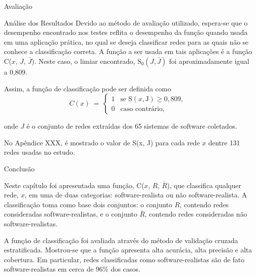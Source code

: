 \begin{section}{Avaliação}
\begin{subsection}{Análise dos Resultados}
	Devido ao método de avaliação utilizado, espera-se que o desempenho encontrado nos testes reflita o desempenho da função quando usada em uma aplicação prática, no qual se deseja classificar redes para as quais não se conhece a classificação correta. A função a ser usada em tais aplicações é a função C($x$, $J$, $\bar{J}$). Neste caso, o limiar encontrado, $\mathrm{S}_0(J, \bar{J})$ foi aproximadamente igual a 0,809.
	
	Assim, a função de classificação pode ser definida como	
	$$
	C(x) ~=~ 
	\left\{
	\begin{array}{cl}
	1 & \mbox{se } \mathrm{S}(x, \mbox{J}) \ge 0,809, \\
	0 & \mbox{caso contrário,}
	\end{array}
	\right.
	$$
	
	onde $J$ é o conjunto de redes extraídas dos 65 sistemas de software coletados.
		
	No Apêndice XXX, é mostrado o valor de S(x, J) para cada rede $x$ dentre 131 redes usadas no estudo.
		
\end{subsection}
	
\end{section}

\begin{section}{Conclusão}
	
	Neste capítulo foi apresentada uma função, C($x$, $R$, $\bar{R}$), que classifica qualquer rede, $x$, em uma de duas categorias: software-realista ou não software-realista. A classificação toma como base dois conjuntos: o conjunto $R$, contendo redes consideradas software-realistas, e o conjunto $\bar{R}$, contendo redes consideradas não software-realistas.
	
	A função de classificação foi avaliada através do método de validação cruzada estratificada. Mostrou-se que a função apresenta alta acurácia, alta precisão e alta cobertura. Em particular, redes classificadas como software-realistas são de fato software-realistas em cerca de 96\% dos casos.
	
\end{section}

	
